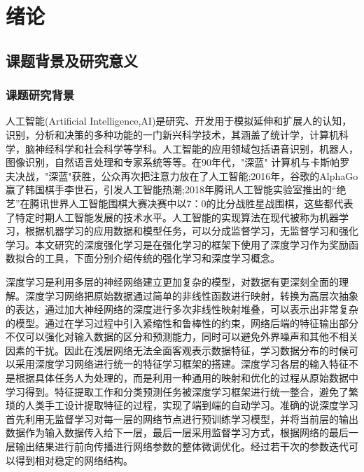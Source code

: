 \chapter{绪论}
\section{课题背景及研究意义}
\subsection{课题研究背景}
人工智能(Artificial Intelligence,AI)是研究、开发用于模拟延伸和扩展人的认知，识别，分析和决策的多种功能的一门新兴科学技术，其涵盖了统计学，计算机科学，脑神经科学和社会科学等学科。人工智能的应用领域包括语音识别，机器人，图像识别，自然语言处理和专家系统等等。在90年代，"深蓝" 计算机与卡斯帕罗夫决战，"深蓝"获胜，公众再次把注意力放在了人工智能;2016年，谷歌的AlphaGo赢了韩国棋手李世石，引发人工智能热潮;2018年腾讯人工智能实验室推出的“绝艺”在腾讯世界人工智能围棋大赛决赛中以7：0的比分战胜星战围棋\cite{人工智能产业形势分析课题组20182018}，这些都代表了特定时期人工智能发展的技术水平。人工智能的实现算法在现代被称为机器学习，根据机器学习的应用数据和模型任务，可以分成监督学习，无监督学习和强化学习。本文研究的深度强化学习是在强化学习的框架下使用了深度学习作为奖励函数拟合的工具，下面分别介绍传统的强化学习和深度学习概念。

深度学习是利用多层的神经网络建立更加复杂的模型，对数据有更深刻全面的理解。深度学习网络把原始数据通过简单的非线性函数进行映射，转换为高层次抽象的表达，通过加大神经网络的深度进行多次非线性映射堆叠，可以表示出非常复杂的模型。通过在学习过程中引入紧缩性和鲁棒性的约束，网络后端的特征输出部分不仅可以强化对输入数据的区分和预测能力，同时可以避免外界噪声和其他不相关因素的干扰。因此在浅层网络无法全面客观表示数据特征，学习数据分布的时候可以采用深度学习网络进行统一的特征学习框架的搭建。深度学习各层的输入特征不是根据具体任务人为处理的，而是利用一种通用的映射和优化的过程从原始数据中学习得到。特征提取工作和分类预测任务被深度学习框架进行统一整合，避免了繁琐的人类手工设计提取特征的过程，实现了端到端的自动学习。准确的说深度学习首先利用无监督学习对每一层的网络节点进行预训练学习模型，并将当前层的输出数据作为输入数据传入给下一层，最后一层采用监督学习方式，根据网络的最后一层输出结果进行前向传播进行网络参数的整体微调优化。经过若干次的参数迭代可以得到相对稳定的网络结构。

